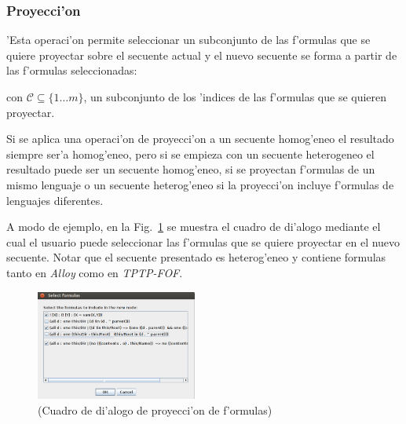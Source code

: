 \subsubsection{Proyecci'on}

'Esta operaci'on  permite seleccionar un subconjunto de las f'ormulas que se quiere proyectar sobre el secuente actual y el nuevo secuente se forma a partir de las f'ormulas seleccionadas:


\begin{prooftree}
\end{prooftree}

con $\mathcal{C} \subseteq \{1 \ldots m\}$, un subconjunto de los 'indices de las f'ormulas que se quieren proyectar.


Si se aplica una operaci'on de proyecci'on a un secuente homog'eneo el resultado siempre ser'a homog'eneo, pero si se empieza con un secuente heterogeneo el resultado puede ser un secuente homog'eneo, si se proyectan f'ormulas de un mismo lenguaje o un secuente heterog'eneo si la proyecci'on incluye f'ormulas de lenguajes diferentes.

A modo de ejemplo, en la Fig.~\ref{seq selection} se muestra el cuadro de di'alogo mediante el cual el usuario puede seleccionar las f'ormulas que se quiere proyectar en el nuevo secuente. Notar que el secuente presentado es heterog'eneo y contiene formulas tanto en \textit{Alloy} como en \textit{TPTP-FOF}.

\begin{figure}[]
	\includegraphics[width=200px]{img/select.png}
	\centering
	\caption{(Cuadro de di'alogo de proyecci'on de f'ormulas)}
        \label{seq selection}
\end{figure}

